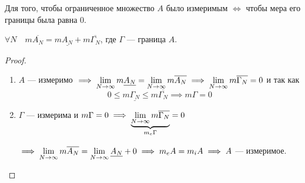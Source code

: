 \begin{theorem}
    Для того, чтобы ограниченное множество $A$ было измеримым $\iff$ чтобы
    мера его границы была равна 0.

    $\forall N \quad m \overline{A_N} = m \underline{A_N} + m \overline{\Gamma_N}$,
    где $\Gamma$ --- граница $A$.
\end{theorem}
\begin{proof}
    \begin{enumerate}
        \item 
            $A$ --- измеримо $\implies 
            \displaystyle\lim_{N \to \infty} m \underline{A_N} = 
            \displaystyle\lim_{N \to \infty} m \overline{A_N} \implies
            \displaystyle\lim_{N \to \infty} m \overline{\Gamma_N} = 0$ и так как
            \[ 
                0 \leq m \underline{\Gamma_N} \leq m \overline{\Gamma_N} 
                \implies m\Gamma = 0 
            \]
        \item
            $\Gamma$ --- измерима и $m\Gamma = 0 \implies 
            \underbrace{\displaystyle\lim_{N \to \infty} m \overline{\Gamma_N}}_{m_e \Gamma} = 0$

            $\implies \displaystyle\lim_{N \to \infty} m \overline{A_N} = 
            \displaystyle\lim_{N \to \infty} \underline{A_N} + 0
            \implies m_e A = m_i A \implies A$ --- измеримое.
    \end{enumerate}
\end{proof}